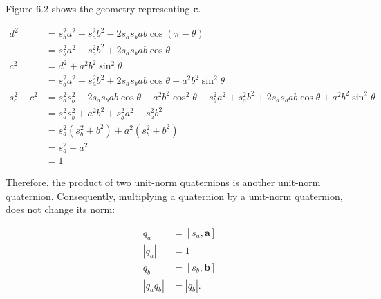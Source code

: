     Figure 6.2 shows the geometry representing $\mathbf{c}$.

    $$
        \begin{aligned}
            d^{2}           & =s_{b}^{2} a^{2}+s_{a}^{2} b^{2}-2 s_{a} s_{b} a b \cos (\pi-\theta)                                                                                                       \\
                            & =s_{b}^{2} a^{2}+s_{a}^{2} b^{2}+2 s_{a} s_{b} a b \cos \theta                                                                                                             \\
            c^{2}           & =d^{2}+a^{2} b^{2} \sin ^{2} \theta                                                                                                                                        \\
                            & =s_{b}^{2} a^{2}+s_{a}^{2} b^{2}+2 s_{a} s_{b} a b \cos \theta+a^{2} b^{2} \sin ^{2} \theta                                                                                \\
            s_{c}^{2}+c^{2} & =s_{a}^{2} s_{b}^{2}-2 s_{a} s_{b} a b \cos \theta+a^{2} b^{2} \cos ^{2} \theta+s_{b}^{2} a^{2}+s_{a}^{2} b^{2}+2 s_{a} s_{b} a b \cos \theta+a^{2} b^{2} \sin ^{2} \theta \\
                            & =s_{a}^{2} s_{b}^{2}+a^{2} b^{2}+s_{b}^{2} a^{2}+s_{a}^{2} b^{2}                                                                                                           \\
                            & =s_{a}^{2}\left(s_{b}^{2}+b^{2}\right)+a^{2}\left(s_{b}^{2}+b^{2}\right)                                                                                                   \\
                            & =s_{a}^{2}+a^{2}                                                                                                                                                           \\
                            & =1
        \end{aligned}
    $$

    Therefore, the product of two unit-norm quaternions is another unit-norm quaternion. Consequently, multiplying a quaternion by a unit-norm quaternion, does not change its norm:

    $$
        \begin{aligned}
            q_{a}                    & =\left[s_{a}, \mathbf{a}\right] \\
            \left|q_{a}\right|       & =1                              \\
            q_{b}                    & =\left[s_{b}, \mathbf{b}\right] \\
            \left|q_{a} q_{b}\right| & =\left|q_{b}\right| .
        \end{aligned}
    $$

